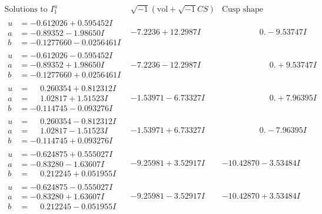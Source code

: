 \documentclass[1p]{elsarticle_modified}
\theoremstyle{definition}
\newcommand{\I}{\sqrt{-1}}
\begin{document}
$$\begin{array}{c|c|c}  
\text{Solutions to }I^u_{1}& \I (\text{vol} + \sqrt{-1}CS) & \text{Cusp shape}\\
 \hline 
\begin{aligned}
u &= -0.612026 + 0.595452 I \\
a &= -0.89352 - 1.98650 I \\
b &= -0.1277660 - 0.0256461 I\end{aligned}
 & -7.2236 + 12.2987 I & \phantom{-0.000000 } 0. - 9.53747 I \\ \hline\begin{aligned}
u &= -0.612026 - 0.595452 I \\
a &= -0.89352 + 1.98650 I \\
b &= -0.1277660 + 0.0256461 I\end{aligned}
 & -7.2236 - 12.2987 I & \phantom{-0.000000 -}0. + 9.53747 I \\ \hline\begin{aligned}
u &= \phantom{-}0.260354 + 0.812312 I \\
a &= \phantom{-}1.02817 + 1.51523 I \\
b &= -0.114745 - 0.093276 I\end{aligned}
 & -1.53971 - 6.73327 I & \phantom{-0.000000 -}0. + 7.96395 I \\ \hline\begin{aligned}
u &= \phantom{-}0.260354 - 0.812312 I \\
a &= \phantom{-}1.02817 - 1.51523 I \\
b &= -0.114745 + 0.093276 I\end{aligned}
 & -1.53971 + 6.73327 I & \phantom{-0.000000 } 0. - 7.96395 I \\ \hline\begin{aligned}
u &= -0.624875 + 0.555027 I \\
a &= -0.83280 - 1.63607 I \\
b &= \phantom{-}0.212245 + 0.051955 I\end{aligned}
 & -9.25981 + 3.52917 I & -10.42870 - 3.53484 I \\ \hline\begin{aligned}
u &= -0.624875 - 0.555027 I \\
a &= -0.83280 + 1.63607 I \\
b &= \phantom{-}0.212245 - 0.051955 I\end{aligned}
 & -9.25981 - 3.52917 I & -10.42870 + 3.53484 I \\ \hline\begin{aligned}

\end{aligned}
\end{array}$$
\end{document}
